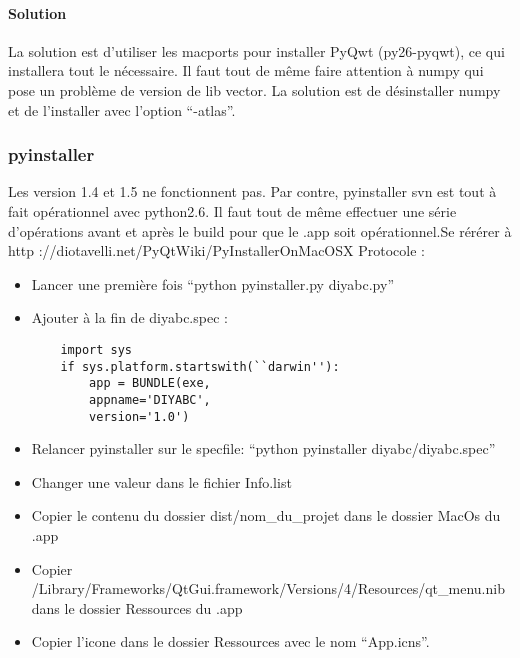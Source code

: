 \documentclass[12pt,a4paper]{article}
\begin{document}
        \paragraph{Solution}

        La solution est d'utiliser les macports pour installer PyQwt
        (py26-pyqwt), ce qui installera tout le n\'ecessaire. Il faut tout de
        même faire attention à numpy qui pose un problème de version de lib
        vector. La solution est de d\'esinstaller numpy et de l'installer avec
        l'option ``-atlas''. 
        
        \subsubsection{pyinstaller}

        Les version 1.4 et 1.5 ne fonctionnent pas. Par contre, pyinstaller svn
        est tout à fait op\'erationnel avec python2.6. Il faut tout de même
        effectuer une s\'erie d'op\'erations avant et après le build pour que le
        .app soit op\'erationnel.Se r\'er\'erer à \newline http
        ://diotavelli.net/PyQtWiki/PyInstallerOnMacOSX \newline
        Protocole : 
        \label{mac_pyinstaller}
        \begin{itemize}
            \item Lancer une première fois ``python pyinstaller.py diyabc.py''
            \item Ajouter à la fin de diyabc.spec :
        \begin{verbatim}
    import sys 
    if sys.platform.startswith(``darwin''): 
        app = BUNDLE(exe, 
        appname='DIYABC', 
        version='1.0')
        \end{verbatim}
            \item Relancer pyinstaller sur le specfile: ``python pyinstaller diyabc/diyabc.spec''
            \item Changer une valeur dans le fichier Info.list
            \item Copier le contenu du dossier dist/nom\_du\_projet dans le dossier MacOs du .app
            \item Copier /Library/Frameworks/QtGui.framework/Versions/4/Resources/qt\_menu.nib dans le dossier Ressources du .app
            \item Copier l'icone dans le dossier Ressources avec le nom ``App.icns''.\\
        \end{itemize}
\end{document}
